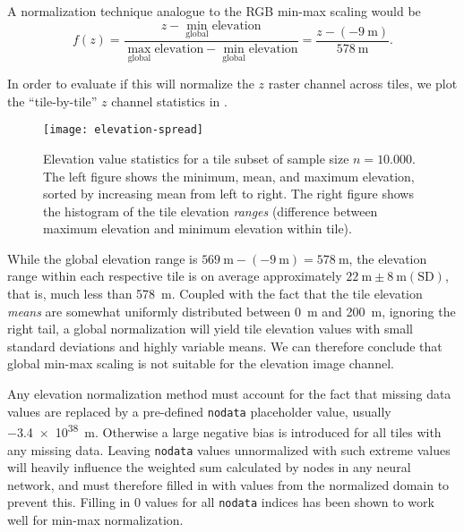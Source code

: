 A normalization technique analogue to the RGB min-max scaling would be
\begin{equation*}
  f(z)
  =
  \frac{
    z - \underset{\mathrm{global}}{\min} \text{elevation}
  }{
    \underset{\mathrm{global}}{\max} \text{elevation} - \underset{\mathrm{global}}{\min} \text{elevation}
  }
  =
  \frac{
    z - (\SI{-9}{\meter})
  }{
    \SI{578}{\meter}
  }.
\end{equation*}

In order to evaluate if this will normalize the $z$ raster channel across tiles, we plot the \enquote{tile-by-tile} $z$ channel statistics in .

\begin{figure}[H]
  \centering
  \texttt{[image: elevation-spread]}
  \caption{
    Elevation value statistics for a tile subset of sample size $n = 10.000$.
    The left figure shows the minimum, mean, and maximum elevation, sorted by increasing mean from left to right.
    The right figure shows the histogram of the tile elevation \textit{ranges} (difference between maximum elevation and minimum elevation within tile).
  }
  \label{fig:elevation-spread}
\end{figure}

While the global elevation range is $\SI{569}{\meter} - (\SI{-9}{\meter}) = \SI{578}{\meter}$, the elevation range within each respective tile is on average approximately $\SI{22}{\meter} \pm \SI{8}{\meter} (\mathrm{SD})$, that is, much less than \SI{578}{\meter}.
Coupled with the fact that the tile elevation \textit{means} are somewhat uniformly distributed between \SI{0}{\meter} and \SI{200}{\meter}, ignoring the right tail, a global normalization will yield tile elevation values with small standard deviations and highly variable means.
We can therefore conclude that global min-max scaling is not suitable for the elevation image channel.


Any elevation normalization method must account for the fact that missing data values are replaced by a pre-defined \texttt{nodata} placeholder value, usually \SI{-3.4e38}{\meter}.
Otherwise a large negative bias is introduced for all tiles with any missing data.
Leaving \texttt{nodata} values unnormalized with such extreme values will heavily influence the weighted sum calculated by nodes in any neural network, and must therefore filled in with values from the normalized domain to prevent this.
Filling in $0$ values for all \texttt{nodata} indices has been shown to work well for min-max normalization.

